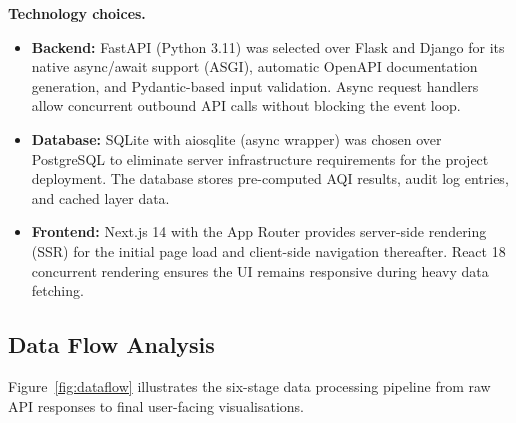 \documentclass[12pt,a4paper]{article}
\begin{document}
\noindent\textbf{Technology choices.}
\begin{itemize}[leftmargin=*]
\item \textbf{Backend:} FastAPI (Python 3.11) was selected over Flask and Django
      for its native async/await support (ASGI), automatic OpenAPI documentation
      generation, and Pydantic-based input validation. Async request handlers
      allow concurrent outbound API calls without blocking the event loop.
\item \textbf{Database:} SQLite with aiosqlite (async wrapper) was chosen over
      PostgreSQL to eliminate server infrastructure requirements for the
      project deployment. The database stores pre-computed AQI results, audit
      log entries, and cached layer data.
\item \textbf{Frontend:} Next.js 14 with the App Router provides server-side
      rendering (SSR) for the initial page load and client-side navigation
      thereafter. React 18 concurrent rendering ensures the UI remains
      responsive during heavy data fetching.
\end{itemize}

\subsection{Data Flow Analysis}
\label{sec:sysdesign:dataflow}

Figure~\ref{fig:dataflow} illustrates the six-stage data processing pipeline
from raw API responses to final user-facing visualisations.
\end{document}
